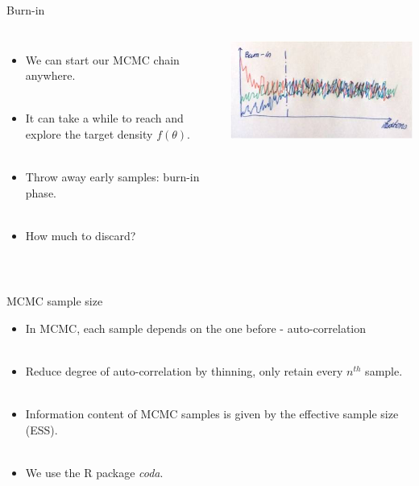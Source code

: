 \documentclass[compress]{beamer}
\begin{document}
\begin{frame}[label=sec-8-8]{Burn-in}
    \begin{columns}[c] 
    \begin{itemize}
        \item We can start our MCMC chain anywhere. \\~\\
        \item It can take a while to reach and explore the target density $f(\theta)$. \\~\\
        \item Throw away early samples: \alert{burn-in} phase. \\~\\
        \item How much to discard? \\~\\
    \end{itemize}
    \includegraphics[width=1\linewidth]{Burn}
\end{columns}
\end{frame} 

\begin{frame}[label=sec-8-9]{MCMC sample size}
    \begin{itemize}
        \item In MCMC, each sample depends on the one before - \alert{auto-correlation} \\~\\
        \item Reduce degree of auto-correlation by \alert{thinning}, only retain every $n^{th}$ sample. \\~\\
        \item Information content of MCMC samples is given by the \alert{effective sample size (ESS)}. \\~\\
        \item We use the R package \textit{coda}.
    \end{itemize}
\end{frame}
\end{document}
